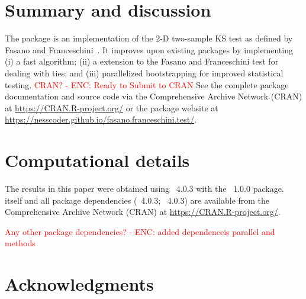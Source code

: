 \documentclass[codesnippet]{jss}
\newcommand{\RBnote}[1]{\textcolor{red}{#1}}
\begin{document}

\section{Summary and discussion} \label{sec:summary}

The  package is an  implementation of the 2-D two-sample KS test as defined by Fasano and Franceschini~\citep{Fasano1987}.
It improves upon existing packages by implementing
  (i) a fast algorithm;
  (ii) a extension to the Fasano and Franceschini test for dealing with ties; and
  (iii) parallelized bootstrapping for improved statistical testing.
\RBnote{CRAN? - ENC: Ready to Submit to CRAN}
  See the complete package documentation and source code via the Comprehensive
 Archive Network (CRAN) at
\url{https://CRAN.R-project.org/} or the package website at \url{https://nesscoder.github.io/fasano.franceschini.test/}.



\section*{Computational details}


The results in this paper were obtained using
~4.0.3 with the
~1.0.0 package.  itself
and all package dependencies (~4.0.3; ~4.0.3) are available from the Comprehensive
 Archive Network (CRAN) at
\url{https://CRAN.R-project.org/}.

\RBnote{Any other package dependencies? - ENC: added dependenceis parallel and methods}

\section*{Acknowledgments}
\end{document}
